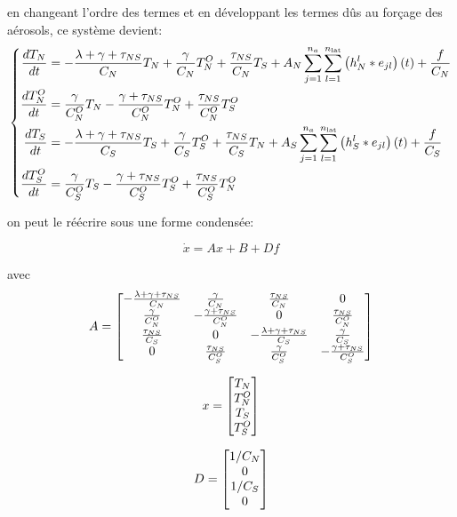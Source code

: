 \documentclass[a4paper,12pt]{article}
\begin{document}
en changeant l'ordre des termes et en développant les termes dûs au forçage des aérosols, ce système devient:
\begin{equation}
  \left\{
  \begin{aligned}
  \frac{dT_N}{dt}&=  -\frac{\lambda+\gamma+\tau_{NS}}{C_N}T_N +\frac{\gamma}{C_N}T_N^O + \frac{\tau_{NS}}{C_N}T_S  
                  +A_N\sum_{j=1}^{n_a}\sum_{l=1}^{n_{\text{lat}}}  \left(h_N^l \ast  e_{jl}\right)(t)
                  +\frac{f}{C_N} \\
  \frac{dT_N^O}{dt}&=\frac{\gamma}{C_N^O}T_N -\frac{\gamma+\tau_{NS}}{C_N^O}T_N^O +\frac{\tau_{NS}}{C_N^O}T_S^O \\
  \frac{dT_S}{dt}&=-\frac{\lambda+\gamma+\tau_{NS}}{C_S}T_S +\frac{\gamma}{C_S}T_S^O
                  +\frac{\tau_{NS}}{C_S}T_N 
                  +A_S\sum_{j=1}^{n_a}\sum_{l=1}^{n_{\text{lat}}}  \left(h_S^l \ast  e_{jl}\right)(t)
                  +\frac{f}{C_S} \\
  \frac{dT_S^O}{dt}&=\frac{\gamma}{C_S^O}T_S -\frac{\gamma+\tau_{NS}}{C_S^O}T_S^O +\frac{\tau_{NS}}{C_S^O}T_N^O \\
\end{aligned}
\right.
\end{equation}

on peut le réécrire sous une forme condensée:

\begin{equation} \dot x = Ax + B  + Df\end{equation}

  avec 
\[
  A = \begin{bmatrix}
    -\frac{\lambda+\gamma+\tau_{NS}}{C_N} & \frac{\gamma}{C_N} &   \frac{\tau_{NS}}{C_N} & 0  \\
    \frac{\gamma}{C_N^O} &  -\frac{\gamma+\tau_{NS}}{C_N^O} & 0 & \frac{\tau_{NS}}{C_N^O} \\
    \frac{\tau_{NS}}{C_S} & 0 & -\frac{\lambda+\gamma+\tau_{NS}}{C_S} & \frac{\gamma}{C_S} \\
    0 & \frac{\tau_{NS}}{C_S^O} &     \frac{\gamma}{C_S^O} & -\frac{\gamma+\tau_{NS}}{C_S^O}   \\
\end{bmatrix}\]

\[
  x =
  \begin{bmatrix}
  T_N \\
  T_N^O \\
  T_S \\
  T_S^O 
\end{bmatrix}\]

\[
  D =
  \begin{bmatrix}
  1/C_N \\
  0 \\
  1/C_S \\
  0 \\
\end{bmatrix}\]
\end{document}
